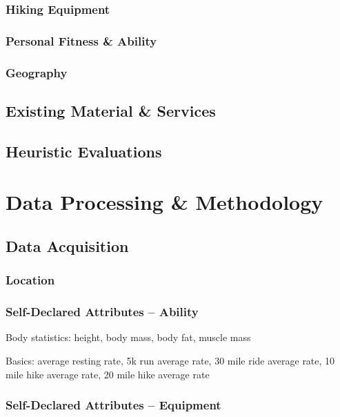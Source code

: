 \documentclass[11pt, english]{article}
\begin{document}
		\subsubsection{Hiking Equipment}

		\subsubsection{Personal Fitness \& Ability}

		\subsubsection{Geography}

	\subsection{Existing Material \& Services}

	\subsection{Heuristic Evaluations}

\newpage

\section{Data Processing \& Methodology}\label{ch3}

	\subsection{Data Acquisition}

		\subsubsection{Location}

		\subsubsection{Self-Declared Attributes -- Ability}

		Body statistics: height, body mass, body fat, muscle mass

		Basics: average resting rate, 5k run average rate, 30 mile ride average rate, 10 mile hike average rate, 20 mile hike average rate

		\subsubsection{Self-Declared Attributes -- Equipment}
\end{document}
